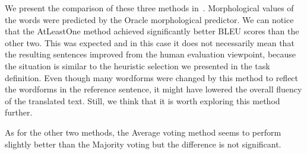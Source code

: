 We present the comparison of these three methods in~. Morphological values of the 
words were predicted by the Oracle morphological predictor.
We can notice that the AtLeastOne method achieved
significantly better BLEU scores than the other two. This was expected and in this case it does
not necessarily mean that the resulting sentences improved from the human evaluation viewpoint, because
the situation is similar to the heuristic selection we presented in the task definition. Even though
many wordforms were changed by this method to reflect the wordforms in the reference sentence, it
might have lowered the overall fluency of the translated text.
Still, we think that it is worth exploring this method further.

As for the other two methods, the Average
voting method seems to perform slightly better than the Majority voting but the difference is not significant.

